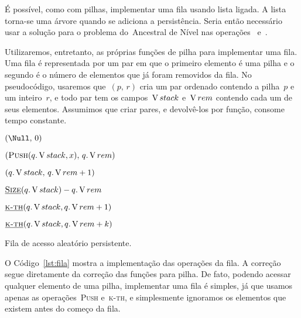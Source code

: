 \documentclass[main.tex]{subfiles}
\begin{document}
É possível, como com pilhas, implementar uma fila usando lista ligada. A lista torna-se uma árvore quando se adiciona a persistência. Seria então necessário usar a solução para o problema do~Ancestral de Nível nas operações~ e~.

Utilizaremos, entretanto, as próprias funções de pilha para implementar uma fila. Uma fila é representada por um par em que o primeiro elemento é uma pilha e o segundo é o número de elementos que já foram removidos da fila. No pseudocódigo, usaremos que~$(p,\,r)$ cria um par ordenado contendo a pilha~$p$ e um inteiro~$r$, e todo par tem os campos~$\operatorname{V}{stack}$ e~$\operatorname{V}{rem}$ contendo cada um de seus elementos.
Assumimos que criar pares, e devolvê-los por função, consome tempo constante.


\begin{algorithm}
\begin{algorithmic}[1]
	\State \Return $(\Null,\,0)$
\EndFunction

	\State \Return $(\Call{Push}{q.\V{stack}, x},\,q.\V{rem})$
\EndFunction

	\State \Return $(q.\operatorname{V}{stack},\,q.\operatorname{V}{rem} + 1)$
\EndFunction

	\State \Return $\mbox{\textsc{\underline{Size}}\ensuremath{(q.\operatorname{V}{stack})}} - q.\operatorname{V}{rem}$ 
\EndFunction

	\State \Return $\mbox{\textsc{\underline{k-th}}\ensuremath{(q.\operatorname{V}{stack}, q.\operatorname{V}{rem} + 1)}}$ 
\EndFunction

	\State \Return $\mbox{\textsc{\underline{k-th}}\ensuremath{(q.\operatorname{V}{stack}, q.\operatorname{V}{rem} + k)}}$ 
\EndFunction

\end{algorithmic}
\caption{Fila de acesso aleatório persistente.} \label{lst:fila}
\end{algorithm}

O Código~\ref{lst:fila} mostra a implementação das operações da fila. A correção segue diretamente da correção das funções para pilha. De fato, podendo acessar qualquer elemento de uma pilha, implementar uma fila é simples, já que usamos apenas as operações~\textsc{Push} e~\textsc{k-th}, e simplesmente ignoramos os elementos que existem antes do começo da fila.

\end{document}
